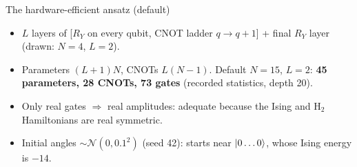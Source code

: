 \documentclass[aspectratio=169,11pt]{beamer}
\newcommand{\key}[1]{{\color{qdark}\textbf{#1}}}
\begin{document}
\begin{frame}[fragile]{The hardware-efficient ansatz (default)}
  \centering
  \\[3mm]
  \raggedright\small
  \begin{itemize}
    \item $L$ layers of [$R_Y$ on every qubit, CNOT ladder $q\to q+1$] + final $R_Y$ layer (drawn: $N = 4$, $L = 2$).
    \item Parameters $(L+1)N$, CNOTs $L(N-1)$. Default $N = 15$, $L = 2$: \key{45 parameters, 28 CNOTs, 73 gates} (recorded statistics, depth 20).
    \item Only real gates $\Rightarrow$ real amplitudes: adequate because the Ising and H$_2$ Hamiltonians are real symmetric.
    \item Initial angles $\sim\mathcal N(0, 0.1^2)$ (seed 42): starts near $\ket{0\dots0}$, whose Ising energy is $-14$.
  \end{itemize}
\end{frame}
\end{document}

